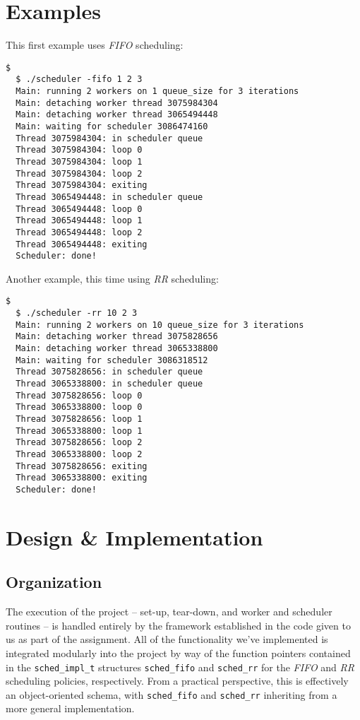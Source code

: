 \documentclass[paper=a4, fontsize=11pt]{scrartcl}
\begin{document}
\section*{Examples}
This first example uses \textit{FIFO} scheduling:
\begin{lstlisting}[style=ShellStyle]$
  $ ./scheduler -fifo 1 2 3
  Main: running 2 workers on 1 queue_size for 3 iterations
  Main: detaching worker thread 3075984304
  Main: detaching worker thread 3065494448
  Main: waiting for scheduler 3086474160
  Thread 3075984304: in scheduler queue
  Thread 3075984304: loop 0
  Thread 3075984304: loop 1
  Thread 3075984304: loop 2
  Thread 3075984304: exiting
  Thread 3065494448: in scheduler queue
  Thread 3065494448: loop 0
  Thread 3065494448: loop 1
  Thread 3065494448: loop 2
  Thread 3065494448: exiting
  Scheduler: done!
\end{lstlisting}
\pagebreak
Another example, this time using \textit{RR} scheduling:
\begin{lstlisting}[style=ShellStyle]$
  $ ./scheduler -rr 10 2 3
  Main: running 2 workers on 10 queue_size for 3 iterations
  Main: detaching worker thread 3075828656
  Main: detaching worker thread 3065338800
  Main: waiting for scheduler 3086318512
  Thread 3075828656: in scheduler queue
  Thread 3065338800: in scheduler queue
  Thread 3075828656: loop 0
  Thread 3065338800: loop 0
  Thread 3075828656: loop 1
  Thread 3065338800: loop 1
  Thread 3075828656: loop 2
  Thread 3065338800: loop 2
  Thread 3075828656: exiting
  Thread 3065338800: exiting
  Scheduler: done!
\end{lstlisting}

\section*{Design \& Implementation}
\subsection*{Organization}
The execution of the project -- set-up, tear-down, and worker and scheduler routines -- is handled entirely by the framework established in the code given to us as part of the assignment. All of the functionality we've implemented is integrated modularly into the project by way of the function pointers contained in the \texttt{sched\_impl\_t} structures \texttt{sched\_fifo} and \texttt{sched\_rr} for the \textit{FIFO} and \textit{RR} scheduling policies, respectively. From a practical perspective, this is effectively an object-oriented schema, with \texttt{sched\_fifo} and \texttt{sched\_rr} inheriting from a more general implementation.
\end{document}
